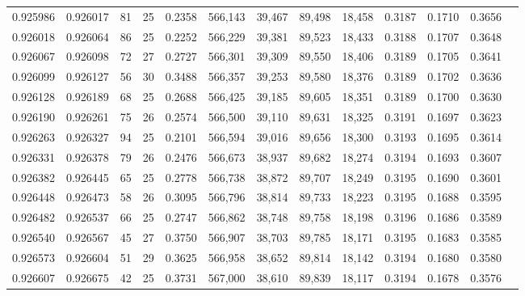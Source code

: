 \begin{tabular}{rrrrrrrrrrrrr}
0.925986 & 0.926017 &    81 &  25 &                                     0.2358 & 566,143 &  39,467 &  89,498 &  18,458 & 0.3187 & 0.1710 & 0.3656 \\
0.926018 & 0.926064 &    86 &  25 &                                     0.2252 & 566,229 &  39,381 &  89,523 &  18,433 & 0.3188 & 0.1707 & 0.3648 \\
0.926067 & 0.926098 &    72 &  27 &                                     0.2727 & 566,301 &  39,309 &  89,550 &  18,406 & 0.3189 & 0.1705 & 0.3641 \\
0.926099 & 0.926127 &    56 &  30 &                                     0.3488 & 566,357 &  39,253 &  89,580 &  18,376 & 0.3189 & 0.1702 & 0.3636 \\
0.926128 & 0.926189 &    68 &  25 &                                     0.2688 & 566,425 &  39,185 &  89,605 &  18,351 & 0.3189 & 0.1700 & 0.3630 \\
0.926190 & 0.926261 &    75 &  26 &                                     0.2574 & 566,500 &  39,110 &  89,631 &  18,325 & 0.3191 & 0.1697 & 0.3623 \\
0.926263 & 0.926327 &    94 &  25 &                                     0.2101 & 566,594 &  39,016 &  89,656 &  18,300 & 0.3193 & 0.1695 & 0.3614 \\
0.926331 & 0.926378 &    79 &  26 &                                     0.2476 & 566,673 &  38,937 &  89,682 &  18,274 & 0.3194 & 0.1693 & 0.3607 \\
0.926382 & 0.926445 &    65 &  25 &                                     0.2778 & 566,738 &  38,872 &  89,707 &  18,249 & 0.3195 & 0.1690 & 0.3601 \\
0.926448 & 0.926473 &    58 &  26 &                                     0.3095 & 566,796 &  38,814 &  89,733 &  18,223 & 0.3195 & 0.1688 & 0.3595 \\
0.926482 & 0.926537 &    66 &  25 &                                     0.2747 & 566,862 &  38,748 &  89,758 &  18,198 & 0.3196 & 0.1686 & 0.3589 \\
0.926540 & 0.926567 &    45 &  27 &                                     0.3750 & 566,907 &  38,703 &  89,785 &  18,171 & 0.3195 & 0.1683 & 0.3585 \\
0.926573 & 0.926604 &    51 &  29 &                                     0.3625 & 566,958 &  38,652 &  89,814 &  18,142 & 0.3194 & 0.1680 & 0.3580 \\
0.926607 & 0.926675 &    42 &  25 &                                     0.3731 & 567,000 &  38,610 &  89,839 &  18,117 & 0.3194 & 0.1678 & 0.3576 \\

\end{tabular}
